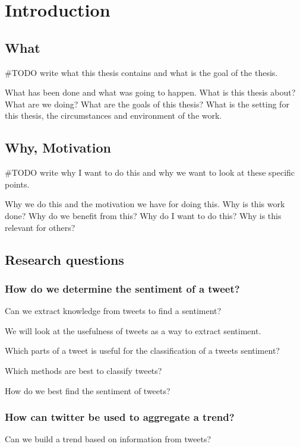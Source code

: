 \chapter{Introduction}

\section{What}
#TODO write what this thesis contains and what is the goal of the thesis. 

What has been done and what was going to happen.
What is this thesis about? What are we doing? What are the goals of this
thesis? What is the setting for this thesis, the circumstances and environment
of the work. 

\section{Why, Motivation}
#TODO write why I want to do this and why we want to look at these specific
points. 

Why we do this and the motivation we have for doing this.
Why is this work done? Why do we benefit from this? Why do I want to do this?
Why is this relevant for others? 

\section{Research questions}
\subsection{How do we determine the sentiment of a tweet?\\}
Can we extract knowledge from tweets to find a sentiment?
	
We will look at the usefulness of tweets as a way to extract sentiment. 

Which parts of a tweet is useful for the classification of a tweets sentiment?

Which methods are best to classify tweets? 

How do we best find the sentiment of tweets?

\subsection{How can twitter be used to aggregate a trend?\\}
Can we build a trend based on information from tweets? 
 
